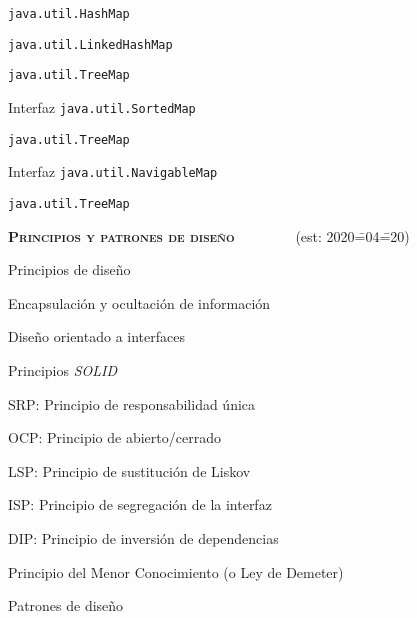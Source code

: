 \begin{longenum}
\begin{longenum}
\begin{longenum}
\begin{longenum}
                \item \texttt{java.util.HashMap}
                \item \texttt{java.util.LinkedHashMap}
                \item \texttt{java.util.TreeMap}
            \end{longenum}
            \item Interfaz \texttt{java.util.SortedMap}
            \begin{longenum}
                \item \texttt{java.util.TreeMap}
            \end{longenum}
            \item Interfaz \texttt{java.util.NavigableMap}
            \begin{longenum}
                \item \texttt{java.util.TreeMap}
            \end{longenum}
        \end{longenum}
    \end{longenum}
    \item \textbf{\textsc{Principios y patrones de diseño}} \ \ \ \ \ \ \ \ (est: 2020\==04\==20)
    \begin{longenum}
        \item Principios de diseño
        \begin{longenum}
            \item Encapsulación y ocultación de información
            \item Diseño orientado a interfaces
            \item Principios \textit{SOLID}
            \begin{longenum}
                \item SRP: Principio de responsabilidad única
                \item OCP: Principio de abierto/cerrado
                \item LSP: Principio de sustitución de Liskov
                \item ISP: Principio de segregación de la interfaz
                \item DIP: Principio de inversión de dependencias
            \end{longenum}
            \item Principio del Menor Conocimiento (o Ley de Demeter)
        \end{longenum}
        \item Patrones de diseño

\end{longenum}
\end{longenum}

